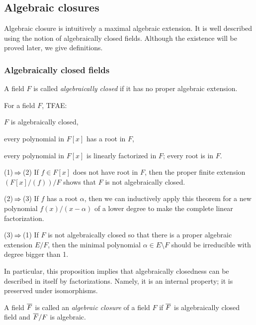 \documentclass{../exp}
\begin{document}
\subsection{Algebraic closures}

Algebraic closure is intuitively a maximal algebraic extension.
It is well described using the notion of algebraically closed fields.
Although the existence will be proved later, we give definitions.

\subsubsection{Algebraically closed fields}
\begin{defn}
A field $F$ is called \emph{algebraically closed} if it has no proper algebraic extension.
\end{defn}

\begin{prop}
For a field $F$, TFAE:
\begin{cond}
\item $F$ is algebraically closed,
\item every polynomial in $F[x]$ has a root in $F$,
\item every polynomial in $F[x]$ is linearly factorized in $F$; every root is in $F$.
\end{cond}
\end{prop}
\begin{pf}
(1)$\impl$(2)
If $f\in F[x]$ does not have root in $F$, then the proper finite extension $(F[x]/(f))/F$ shows that $F$ is not algebraically closed.

(2)$\impl$(3)
If $f$ has a root $\alpha$, then we can inductively apply this theorem for a new polynomial $f(x)/(x-\alpha)$ of a lower degree to make the complete linear factorization.

(3)$\impl$(1)
If $F$ is not algebraically closed so that there is a proper algebraic extension $E/F$, then the minimal polynomial $\alpha\in E\setminus F$ should be irreducible with degree bigger than 1.
\end{pf}
\begin{rmk}
In particular, this proposition implies that algebraically closedness can be described in itself by factorizations.
Namely, it is an internal property; it is preserved under isomorphisms.
\end{rmk}


\begin{defn}
A field $\overline F$ is called an \emph{algebraic closure} of a field $F$ if $\overline F$ is algebraically closed field and $\overline F/F$ is algebraic.
\end{defn}
\end{document}
